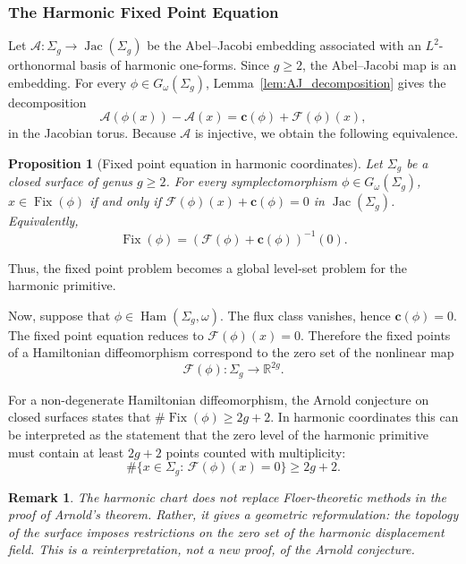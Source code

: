 \documentclass[11pt]{article}
\newtheorem{proposition}[theorem]{Proposition}
\newtheorem{remark}[theorem]{Remark}
\theoremstyle{definition}
\newcommand{\Jac}{\operatorname{Jac}}
\newcommand{\Ham}{\operatorname{Ham}}
\begin{document}
	\subsubsection{The Harmonic Fixed Point Equation}
	
	Let $\mathcal A:\Sigma_g\longrightarrow \Jac(\Sigma_g)$ be the Abel--Jacobi
	embedding associated with an $L^2$-orthonormal basis of harmonic one-forms.
	Since $g\geq 2$, the Abel--Jacobi map is an embedding. For every $\phi\in
	G_\omega(\Sigma_g)$, Lemma~\ref{lem:AJ_decomposition} gives the decomposition
	\[
	\mathcal A(\phi(x))-\mathcal A(x) = \mathbf c(\phi)+\mathcal F(\phi)(x),
	\]
	in the Jacobian torus. Because $\mathcal A$ is injective, we obtain the
	following equivalence.
	
	\begin{proposition}[Fixed point equation in harmonic coordinates]
		\label{prop:harmonic_fixed_point}
		Let $\Sigma_g$ be a closed surface of genus $g\geq2$. For every symplectomorphism
		$\phi\in G_\omega(\Sigma_g)$, $x\in\operatorname{Fix}(\phi)$ if and only if
		$\mathcal F(\phi)(x)+\mathbf c(\phi)=0$ in $\Jac(\Sigma_g)$. Equivalently,
		\[
		\operatorname{Fix}(\phi) = \left(\mathcal F(\phi)+\mathbf
		c(\phi)\right)^{-1}(0).
		\]
	\end{proposition}
	
	Thus, the fixed point problem becomes a global level-set problem for the
	harmonic primitive.
	
	Now, suppose that $\phi\in\Ham(\Sigma_g,\omega).$ The flux class vanishes, hence
	$\mathbf c(\phi)=0.$ The fixed point equation reduces to $\mathcal
	F(\phi)(x)=0.$ Therefore the fixed points of a Hamiltonian diffeomorphism
	correspond to the zero set of the nonlinear map
	\[
	\mathcal F(\phi): \Sigma_g\longrightarrow \mathbb R^{2g}.
	\]
	
	For a non-degenerate Hamiltonian diffeomorphism, the Arnold conjecture on closed
	surfaces states that $\#\operatorname{Fix}(\phi)\geq 2g+2.$ In harmonic
	coordinates this can be interpreted as the statement that the zero level of the
	harmonic primitive must contain at least $2g+2$ points counted with multiplicity:
	\[
	\#\{x\in\Sigma_g:\, \mathcal F(\phi)(x)=0\} \geq 2g+2.
	\]
	
	\begin{remark}
		The harmonic chart does not replace Floer-theoretic methods in the proof of
		Arnold's theorem. Rather, it gives a geometric reformulation: the topology of
		the surface imposes restrictions on the zero set of the harmonic displacement
		field. This is a reinterpretation, not a new proof, of the Arnold conjecture.
	\end{remark}
	
\end{document}
